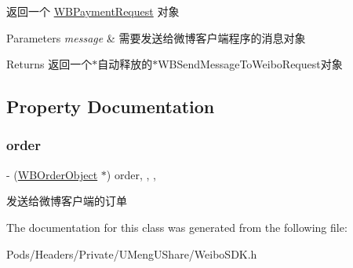 返回一个 \mbox{\hyperlink{interface_w_b_payment_request}{W\+B\+Payment\+Request}} 对象 
\begin{DoxyParams}{Parameters}
{\em message} & 需要发送给微博客户端程序的消息对象 \\
\hline
\end{DoxyParams}
\begin{DoxyReturn}{Returns}
返回一个$\ast$自动释放的$\ast$\+W\+B\+Send\+Message\+To\+Weibo\+Request对象 
\end{DoxyReturn}


\subsection{Property Documentation}
\mbox{\label{interface_w_b_payment_request_a20a30e6925133ce010e2f3b587b4117b}} 
\subsubsection{\texorpdfstring{order}{order}}
{\footnotesize\ttfamily -\/ (\mbox{\hyperlink{interface_w_b_order_object}{W\+B\+Order\+Object}} $\ast$) order\hspace{0.3cm}{\ttfamily [read]}, {\ttfamily [write]}, {\ttfamily [nonatomic]}, {\ttfamily [strong]}}

发送给微博客户端的订单 

The documentation for this class was generated from the following file\+:\begin{DoxyCompactItemize}
\item 
Pods/\+Headers/\+Private/\+U\+Meng\+U\+Share/Weibo\+S\+D\+K.\+h\end{DoxyCompactItemize}
